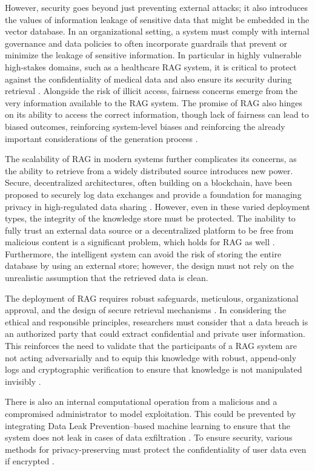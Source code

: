 \documentclass[11pt]{article}
\begin{document}
However, security goes beyond just preventing external attacks; it also introduces the values of information leakage of sensitive data that might be embedded in the vector database. In an organizational setting, a system must comply with internal governance and data policies to often incorporate guardrails that prevent or minimize the leakage of sensitive information. In particular in highly vulnerable high-stakes domains, such as a healthcare RAG system, it is critical to protect against the confidentiality of medical data and also ensure its security during retrieval \cite{ref447}. Alongside the risk of illicit access, fairness concerns emerge from the very information available to the RAG system. The promise of RAG also hinges on its ability to access the correct information, though lack of fairness can lead to biased outcomes, reinforcing system-level biases and reinforcing the already important considerations of the generation process \cite{ref140}.

The scalability of RAG in modern systems further complicates its concerns, as the ability to retrieve from a widely distributed source introduces new power. Secure, decentralized architectures, often building on a blockchain, have been proposed to securely log data exchanges and provide a foundation for managing privacy in high-regulated data sharing \cite{ref448,ref449}. However, even in these varied deployment types, the integrity of the knowledge store must be protected. The inability to fully trust an external data source or a decentralized platform to be free from malicious content is a significant problem, which holds for RAG as well \cite{ref450}. Furthermore, the intelligent system can avoid the risk of storing the entire database by using an external store; however, the design must not rely on the unrealistic assumption that the retrieved data is clean.

The deployment of RAG requires robust safeguards, meticulous, organizational approval, and the design of secure retrieval mechanisms \cite{ref451}. In considering the ethical and responsible principles, researchers must consider that a data breach is an authorized party that could extract confidential and private user information. This reinforces the need to validate that the participants of a RAG system are not acting adversarially and to equip this knowledge with robust, append-only logs and cryptographic verification to ensure that knowledge is not manipulated invisibly \cite{ref446,ref452}.

There is also an internal computational operation from a malicious and a compromised administrator to model exploitation. This could be prevented by integrating Data Leak Prevention--based machine learning to ensure that the system does not leak in cases of data exfiltration \cite{ref453}. To ensure security, various methods for privacy-preserving must protect the confidentiality of user data even if encrypted \cite{ref454}.
\end{document}
